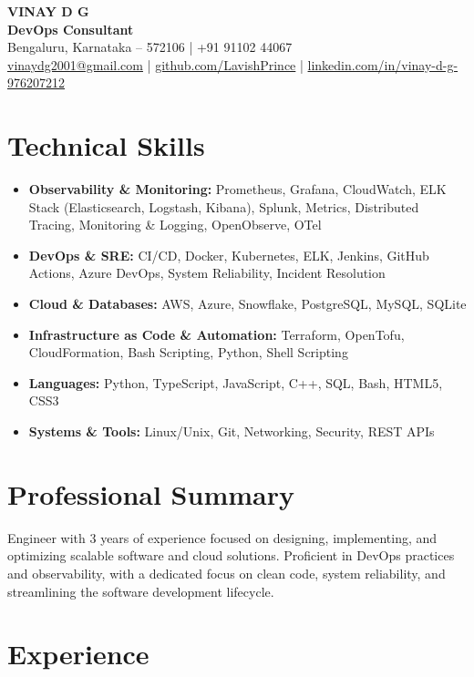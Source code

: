 \documentclass[a4paper,11pt]{article}
\begin{document}
\begin{center}
    \textbf{\Large VINAY D G} \\
    \textbf{DevOps Consultant} \\
    Bengaluru, Karnataka – 572106 \quad | \quad +91 91102 44067 \\
    \href{mailto:vinaydg2001@gmail.com}{vinaydg2001@gmail.com} \quad | \quad \href{https://github.com/LavishPrince}{github.com/LavishPrince} \quad | \quad \href{https://www.linkedin.com/in/vinay-d-g-976207212/}{linkedin.com/in/vinay-d-g-976207212}
\end{center}

\section*{Technical Skills}
\begin{itemize}[leftmargin=0.15in, label={}, nosep]
    \item \textbf{Observability \& Monitoring:} Prometheus, Grafana, CloudWatch, ELK Stack (Elasticsearch, Logstash, Kibana), Splunk, Metrics, Distributed Tracing, Monitoring \& Logging, OpenObserve, OTel
    \item \textbf{DevOps \& SRE:} CI/CD, Docker, Kubernetes, ELK, Jenkins, GitHub Actions, Azure DevOps, System Reliability, Incident Resolution
    \item \textbf{Cloud \& Databases:} AWS, Azure, Snowflake, PostgreSQL, MySQL, SQLite
    \item \textbf{Infrastructure as Code \& Automation:} Terraform, OpenTofu, CloudFormation, Bash Scripting, Python, Shell Scripting
    \item \textbf{Languages:} Python, TypeScript, JavaScript, C++, SQL, Bash, HTML5, CSS3
    \item \textbf{Systems \& Tools:} Linux/Unix, Git, Networking, Security, REST APIs
\end{itemize}

\section*{Professional Summary}
Engineer with 3 years of experience focused on designing, implementing, and optimizing scalable software and cloud solutions. Proficient in DevOps practices and observability, with a dedicated focus on clean code, system reliability, and streamlining the software development lifecycle.

\section*{Experience}
\end{document}
